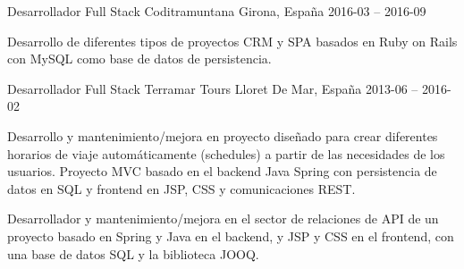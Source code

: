\documentclass[]{awesome-cv}
\begin{document}
\begin{cventries}
	\cventry
	{Desarrollador Full Stack}
	{Coditramuntana}
	{Girona, España}
	{2016-03 – 2016-09}
	{\begin{cvitems}
		\vspace{0.5mm}
		\item {Desarrollo de diferentes tipos de proyectos CRM y SPA basados en Ruby on Rails con MySQL como base de datos de persistencia.}
		\end{cvitems}}


	\cventry
	{Desarrollador Full Stack}
	{Terramar Tours}
	{Lloret De Mar, España}
	{2013-06 – 2016-02}
	{\begin{cvitems}
		\vspace{0.5mm}
		\item {Desarrollo y mantenimiento/mejora en proyecto diseñado para crear diferentes horarios de viaje automáticamente (schedules) a partir de las necesidades de los usuarios. Proyecto MVC basado en el backend Java Spring con persistencia de datos en SQL y frontend en JSP, CSS y comunicaciones REST.}
  \item {Desarrollador y mantenimiento/mejora en el sector de relaciones de API de un proyecto basado en Spring y Java en el backend, y JSP y CSS en el frontend, con una base de datos SQL y la biblioteca JOOQ.}
		\end{cvitems}}
\end{cventries}
\end{document}
